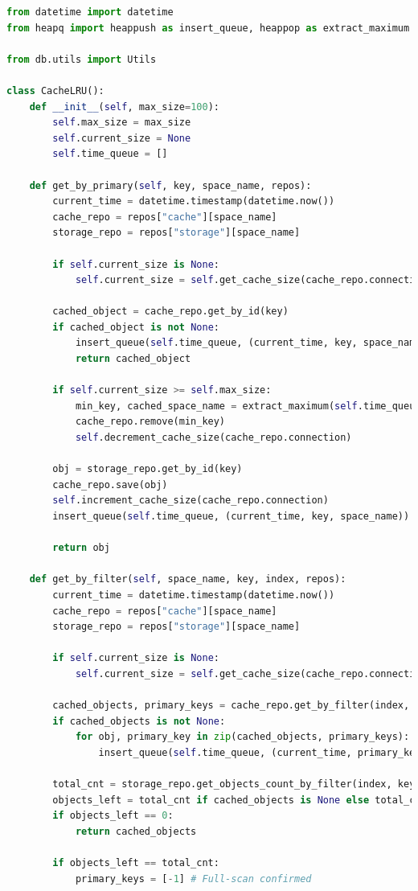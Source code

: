 \begin{lstlisting}[label=lst:cache, caption=Листинг модуля кэширования данных с политикой вытеснения LRU, language=python]
from datetime import datetime
from heapq import heappush as insert_queue, heappop as extract_maximum

from db.utils import Utils

class CacheLRU():
	def __init__(self, max_size=100):
		self.max_size = max_size
		self.current_size = None
		self.time_queue = []
	
	def get_by_primary(self, key, space_name, repos):
		current_time = datetime.timestamp(datetime.now())
		cache_repo = repos["cache"][space_name]
		storage_repo = repos["storage"][space_name]
		
		if self.current_size is None:
			self.current_size = self.get_cache_size(cache_repo.connection)
		
		cached_object = cache_repo.get_by_id(key)
		if cached_object is not None:
			insert_queue(self.time_queue, (current_time, key, space_name))
			return cached_object
		
		if self.current_size >= self.max_size:
			min_key, cached_space_name = extract_maximum(self.time_queue)[1:]
			cache_repo.remove(min_key)
			self.decrement_cache_size(cache_repo.connection)
		
		obj = storage_repo.get_by_id(key)
		cache_repo.save(obj)
		self.increment_cache_size(cache_repo.connection)
		insert_queue(self.time_queue, (current_time, key, space_name))
		
		return obj
	
	def get_by_filter(self, space_name, key, index, repos):
		current_time = datetime.timestamp(datetime.now())
		cache_repo = repos["cache"][space_name]
		storage_repo = repos["storage"][space_name]
		
		if self.current_size is None:
			self.current_size = self.get_cache_size(cache_repo.connection)
		
		cached_objects, primary_keys = cache_repo.get_by_filter(index, key)
		if cached_objects is not None:
			for obj, primary_key in zip(cached_objects, primary_keys):
				insert_queue(self.time_queue, (current_time, primary_key, space_name))
		
		total_cnt = storage_repo.get_objects_count_by_filter(index, key)
		objects_left = total_cnt if cached_objects is None else total_cnt - len(cached_objects)
		if objects_left == 0:
			return cached_objects
		
		if objects_left == total_cnt:
			primary_keys = [-1] # Full-scan confirmed
	

\end{lstlisting}
